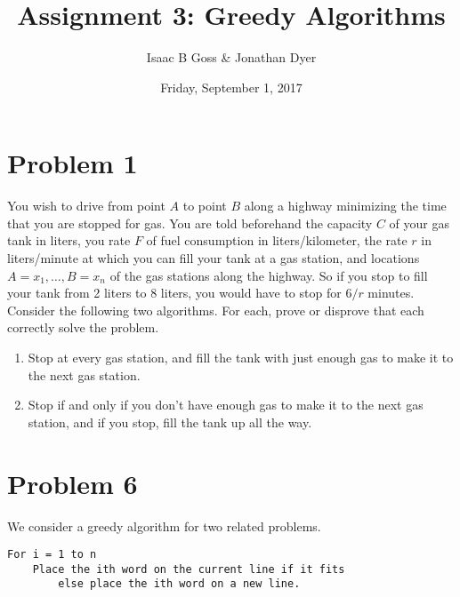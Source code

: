 \documentclass{article}
\author{Isaac B Goss \& Jonathan Dyer}
\title{Assignment 3: Greedy Algorithms}
\date{Friday, September 1, 2017}
\providecommand{\prob}[1]{\section*{Problem #1}}
\begin{document}
\maketitle

    \prob{1}
    You wish to drive from point $A$ to point $B$ along a highway minimizing the time that you are stopped for gas. You are told beforehand the capacity $C$ of your gas tank in liters, you rate $F$ of fuel consumption in liters/kilometer, the rate $r$ in liters/minute at which you can fill your tank at a gas station, and locations $A = x_1, \dots, B = x_n$ of the gas stations along the highway. So if you stop to fill your tank from 2 liters to 8 liters, you would have to stop for $6/r$ minutes. Consider the following two algorithms. For each, prove or disprove that each correctly solve the problem.
    
    \begin{enumerate}[label=(\alph*)]
        \item Stop at every gas station, and fill the tank with just enough gas to make it to the next gas station.
        
        \item Stop if and only if you don't have enough gas to make it to the next gas station, and if you stop, fill the tank up all the way.
    \end{enumerate}
    

    \prob{6}
    We consider a greedy algorithm for two related problems.
    
    \begin{lstlisting}
For i = 1 to n
    Place the ith word on the current line if it fits
        else place the ith word on a new line.
    \end{lstlisting}
    
\end{document}
